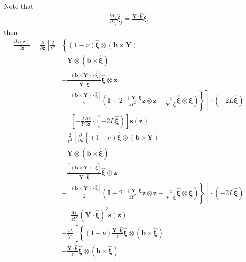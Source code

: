 \documentclass[10pt]{report}
\begin{document}
{\begin{align}
\end{align}
Note that 
\begin{align}
\frac{\partial {Y_i}}{\partial z_j}\hat{\xi}_j=\frac{\bm Y\cdot\hat{\bm\xi}}{z}\hat{\xi}_i
\end{align}
then
\begin{align}
\frac{\partial \tilde {\bm s}(\bm z)}{\partial \bm z}
=\frac{\partial}{\partial \bm z}\left[\frac{2}{Y^2}\right.&
\left\{
(1-\nu)\hat{\bm\xi}\otimes\left(\bm b\times \bm Y\right)\right.\nonumber\\
&-\bm Y\otimes\left(\bm b\times\hat{\bm \xi}\right)\nonumber\\
&-\frac{\left[\left(\bm b\times\bm Y\right)\cdot\hat{\bm \xi}\right]}{\bm Y\cdot \hat{\bm \xi}}\hat{\bm\xi}\otimes\bm z\nonumber\\
&\left.\left.-\frac{\left[\left(\bm b\times\bm Y\right)\cdot\hat{\bm \xi}\right]}{2}\left(\bm I+2\frac{z+\bm Y\cdot \hat{\bm \xi}}{zY^2}\bm z\otimes\bm z+\frac{z}{\bm Y\cdot \hat{\bm \xi}}\hat{\bm\xi}\otimes\hat{\bm\xi}\right)\right\}\right]\cdot(-2L\hat{\bm \xi})\nonumber\\
%
&=\left[-\frac{2}{Y}\frac{\partial Y}{\partial \bm z}\cdot\left(-2L\hat{\bm \xi}\right)\right]\tilde{\bm s}(\bm z)\nonumber\\
&+\frac{2}{Y^2}\left[\frac{\partial}{\partial \bm z}
\left\{
(1-\nu)\hat{\bm\xi}\otimes\left(\bm b\times \bm Y\right)\right.\right.\nonumber\\
&-\bm Y\otimes\left(\bm b\times\hat{\bm \xi}\right)\nonumber\\
&-\frac{\left[\left(\bm b\times\bm Y\right)\cdot\hat{\bm \xi}\right]}{\bm Y\cdot \hat{\bm \xi}}\hat{\bm\xi}\otimes\bm z\nonumber\\
&\left.\left.-\frac{\left[\left(\bm b\times\bm Y\right)\cdot\hat{\bm \xi}\right]}{2}\left(\bm I+2\frac{z+\bm Y\cdot \hat{\bm \xi}}{zY^2}\bm z\otimes\bm z+\frac{z}{\bm Y\cdot \hat{\bm \xi}}\hat{\bm\xi}\otimes\hat{\bm\xi}\right)\right\}\right]\cdot(-2L\hat{\bm \xi})\nonumber\\
%
&=\frac{4L}{zY^2}\left(\bm Y\cdot\hat{\bm \xi}\right)^2\tilde{\bm s}(\bm z)\nonumber\\
&-\frac{4L}{Y^2}\left[
\left\{
(1-\nu)\frac{\bm Y\cdot\hat{\bm \xi}}{z}\hat{\bm\xi}\otimes\left(\bm b\times \hat{\bm \xi}\right)\right.\right.\nonumber\\
&-\frac{\bm Y\cdot\hat{\bm \xi}}{z}\hat{\bm \xi}\otimes\left(\bm b\times\hat{\bm \xi}\right)\nonumber\\

\end{align}}
\end{document}
